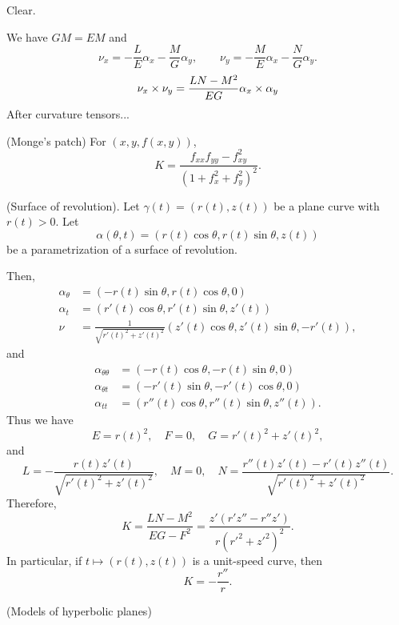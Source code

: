 \documentclass{../exp}
\def\a{\alpha}
\begin{document}
\begin{pf}$ $\\[-12pt]
\begin{cond}
\item Clear.
\item
We have $GM=EM$ and
\[\nu_x=-\frac LE\a_x-\frac MG\a_y,\qquad\nu_y=-\frac ME\a_x-\frac NG\a_y.\]
\[\nu_x\x\nu_y=\frac{LN-M^2}{EG}\a_x\x\a_y\]
After curvature tensors...
\end{cond}
\end{pf}



\begin{exs}
\item
(Monge's patch)
For $(x,y,f(x,y))$,
\[K=\frac{f_{xx}f_{yy}-f_{xy}^2}{(1+f_x^2+f_y^2)^2}.\]
\item
(Surface of revolution).
Let $\gamma(t)=(r(t),z(t))$ be a plane curve with $r(t)>0$.
Let
\[\a(\theta,t)=(r(t)\cos\theta,r(t)\sin\theta,z(t))\]
be a parametrization of a surface of revolution.

Then,
\begin{align*}
\a_\theta&=(-r(t)\sin\theta,r(t)\cos\theta,0)\\
\a_t&=(r'(t)\cos\theta,r'(t)\sin\theta,z'(t))\\
\nu&=\frac1{\sqrt{r'(t)^2+z'(t)^2}}(z'(t)\cos\theta,z'(t)\sin\theta,-r'(t)),
\end{align*}
and
\begin{align*}
\a_{\theta\theta}&=(-r(t)\cos\theta,-r(t)\sin\theta,0)\\
\a_{\theta t}&=(-r'(t)\sin\theta,-r'(t)\cos\theta,0)\\
\a_{tt}&=(r''(t)\cos\theta,r''(t)\sin\theta,z''(t)).
\end{align*}
Thus we have
\[E=r(t)^2,\quad F=0,\quad G=r'(t)^2+z'(t)^2,\]
and
\[L=-\frac{r(t)z'(t)}{\sqrt{r'(t)^2+z'(t)^2}},\quad M=0,\quad N=\frac{r''(t)z'(t)-r'(t)z''(t)}{\sqrt{r'(t)^2+z'(t)^2}}.\]
Therefore,
\[K=\frac{LN-M^2}{EG-F^2}=\frac{z'(r'z''-r''z')}{r(r'^2+z'^2)^2}.\]
In particular, if $t\mapsto(r(t),z(t))$ is a unit-speed curve, then
\[K=-\frac{r''}r.\]

\item
(Models of hyperbolic planes)
\end{exs}



\end{document}
